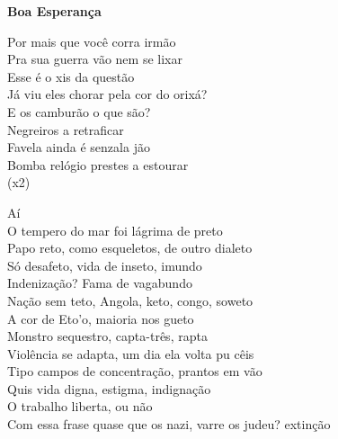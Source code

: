 \begin{center}
    \textbf{Boa Esperança}
\end{center}

\noindent
Por mais que você corra irmão\\
Pra sua guerra vão nem se lixar\\
Esse é o xis da questão\\
Já viu eles chorar pela cor do orixá?\\
E os camburão o que são?\\
Negreiros a retraficar\\
Favela ainda é senzala jão\\
Bomba relógio prestes a estourar\\
(x2)

\vspace{0.3cm}

\noindent
Aí\\
O tempero do mar foi lágrima de preto\\
Papo reto, como esqueletos, de outro dialeto\\
Só desafeto, vida de inseto, imundo\\
Indenização? Fama de vagabundo\\
Nação sem teto, Angola, keto, congo, soweto\\
A cor de Eto'o, maioria nos gueto\\
Monstro sequestro, capta-três, rapta\\
Violência se adapta, um dia ela volta pu cêis\\
Tipo campos de concentração, prantos em vão\\
Quis vida digna, estigma, indignação\\
O trabalho liberta, ou não\\
Com essa frase quase que os nazi, varre os judeu? extinção\\
[...]



